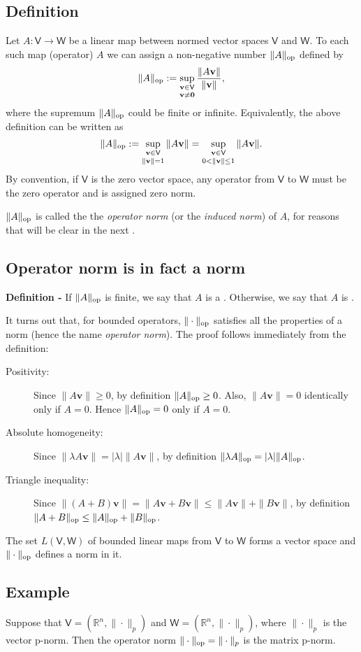 \documentclass[12pt]{article}
\def\V{{\mathsf V}}
\def\W{{\mathsf W}}
\def\R{{\mathbb R}}
\def\v{{\mathbf v}}
\def\op{{\rm op}}
\begin{document}
\subsection*{Definition}

Let $A\colon \V\to\W$ be a linear map between normed vector spaces $\V$ and
$\W$. To each such map (operator) $A$ we can assign a non-negative number
$\|A\|_{\op}$ defined by
\[
 \|A\|_{\op} := \mathop{\sup_{\v\in\V}}_{\v\ne{\bf 0}} \frac{\|A\v\|}{\|\v\|},
\]
where the supremum $\|A\|_{\op}$ could be finite or infinite.
Equivalently, the above definition can be written as
\[
 \|A\|_\op := \mathop{\sup_{\v\in\V}}_{\|\v\|=1} \|A\v\|
    = \mathop{\sup_{\v\in\V}}_{0<\|\v\|\le1} \|A\v\|.
\]
By convention, if $\V$ is the zero vector space, any operator from $\V$
to $\W$ must be the zero operator and is assigned zero norm.

$\|A\|_{\op}$ is called the the \emph{operator norm} (or the \emph{induced norm})
of $A$, for reasons that will be clear in the next .

\subsection*{Operator norm is in fact a norm}

{\bf Definition -} If $\|A\|_{\op}$ is finite, we say that $A$ is a
\emph{}. Otherwise, we say that $A$ is \emph{}.


It turns out that, for bounded operators, $\|\cdot\|_{\op}$ satisfies all the properties of a norm
(hence the name \emph{operator norm}). The proof follows immediately from the definition:

\begin{description}
\item[Positivity:]
  Since $\|A\v\|\ge 0$, by definition
  $\|A\|_\op \ge 0$. Also, $\|A\v\| = 0$ identically only if $A=0$.
  Hence $\|A\|_\op = 0$ only if $A = 0$.
\item[Absolute homogeneity:]
  Since $\|\lambda A\v\|=|\lambda| \|A\v\|$, by definition
  $\|\lambda A\|_\op = |\lambda| \|A\|_\op$.
\item[Triangle inequality:]
  Since $\|(A+B)\v\|=\|A\v+B\v\|\le \|A\v\| + \|B\v\|$, by definition
  $\|A+B\|_\op \le \|A\|_\op + \|B\|_\op$.
\end{description}

The set $L(\V,\W)$ of bounded linear maps from ${\mathsf V}$ to ${\mathsf W}$ forms a vector space and $\|\cdot\|_{\op}$ defines a norm in it.


\subsection*{Example}
Suppose that $\V=(\R^n,\|\cdot\|_p)$ and $\W=(\R^n,\|\cdot\|_p)$, where
$\|\cdot\|_p$ is the vector p-norm. Then the operator norm
$\|\cdot\|_\op = \|\cdot\|_p$ is the matrix p-norm.
\end{document}
